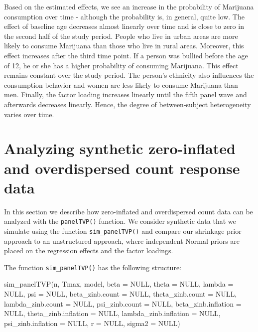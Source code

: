 \documentclass[a4paper, preprint, 3p,
authoryear]{elsarticle} %
\newenvironment{Shaded}{\begin{snugshade}}{\end{snugshade}}
\newcommand{\NormalTok}[1]{#1}
\begin{document}
Based on the estimated effects, we see an increase in the probability of
Marijuana consumption over time - although the probability is, in
general, quite low. The effect of baseline age decreases almost linearly
over time and is close to zero in the second half of the study period.
People who live in urban areas are more likely to consume Marijuana than
those who live in rural areas. Moreover, this effect increases after the
third time point. If a person was bullied before the age of 12, he or
she has a higher probability of consuming Marijuana. This effect remains
constant over the study period. The person's ethnicity also influences
the consumption behavior and women are less likely to consume Marijuana
than men. Finally, the factor loading increases linearly until the fifth
panel wave and afterwards decreases linearly. Hence, the degree of
between-subject heterogeneity varies over time.

\section{Analyzing synthetic zero-inflated and overdispersed count
response
data}\label{analyzing-synthetic-zero-inflated-and-overdispersed-count-response-data}

In this section we describe how zero-inflated and overdispersed count
data can be analyzed with the \texttt{panelTVP()} function. We consider
synthetic data that we simulate using the function
\texttt{sim\_panelTVP()} and compare our shrinkage prior approach to an
unstructured approach, where independent Normal priors are placed on the
regression effects and the factor loadings.

The function \texttt{sim\_panelTVP()} has the following structure:

\begin{Shaded}
\begin{Highlighting}[]
\NormalTok{sim\_panelTVP(n, Tmax, model,}
\NormalTok{             beta = NULL, theta = NULL,}
\NormalTok{             lambda = NULL, psi = NULL,}
\NormalTok{             beta\_zinb.count = NULL, theta\_zinb.count = NULL,}
\NormalTok{             lambda\_zinb.count = NULL, psi\_zinb.count = NULL,}
\NormalTok{             beta\_zinb.inflation = NULL, theta\_zinb.inflation = NULL,}
\NormalTok{             lambda\_zinb.inflation = NULL, psi\_zinb.inflation = NULL, }
\NormalTok{             r = NULL, sigma2 = NULL)}
\end{Highlighting}
\end{Shaded}
\end{document}
